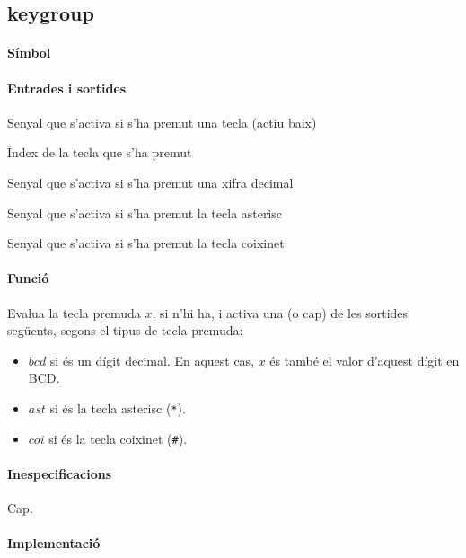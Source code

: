 \subsection{\label{sub:\projectname-keygroup} \textsf{keygroup}}

\paragraph{Símbol}

\begin{center}  \end{center}

\paragraph{Entrades i sortides}

\begin{where}
\item[\nodenamebit{nkey}] Senyal que s'activa si s'ha premut una tecla (actiu baix)
\item[\nodenamerange{x}{3}{0}] Índex de la tecla que s'ha premut
\item[\nodenamebit{bcd}] Senyal que s'activa si s'ha premut una xifra decimal
\item[\nodenamebit{ast}] Senyal que s'activa si s'ha premut la tecla asterisc
\item[\nodenamebit{coi}] Senyal que s'activa si s'ha premut la tecla coixinet
\end{where}

\paragraph{Funció}

Evalua la tecla premuda $x$, si n'hi ha, i activa una (o cap) de les sortides següents,
segons el tipus de tecla premuda:

\begin{itemize}
\item $bcd$ si és un dígit decimal. En aquest cas, $x$ és també
el valor d'aquest dígit en BCD.
\item $ast$ si és la tecla asterisc (\texttt{*}).
\item $coi$ si és la tecla coixinet (\texttt{\#}).
\end{itemize}

\paragraph{Inespecificacions}

Cap.

\paragraph{Implementació}





\vspace{1cm}
